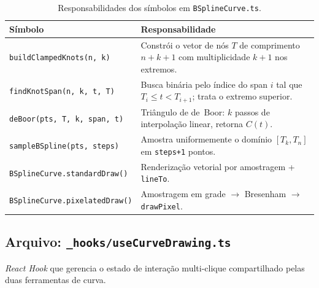 \documentclass[12pt, a4paper]{article}
\theoremstyle{remark}
\newcommand{\file}[1]{\texttt{\small #1}}
\newcommand{\code}[1]{\texttt{#1}}
\begin{document}
\begin{table}[H]
\centering
\begin{tabular}{lp{9.5cm}}
\toprule
\textbf{Símbolo} & \textbf{Responsabilidade} \\
\midrule
\code{buildClampedKnots(n, k)} & Constrói o vetor de nós $T$ de comprimento $n+k+1$
                                  com multiplicidade $k+1$ nos extremos. \\
\code{findKnotSpan(n, k, t, T)} & Busca binária pelo índice do span $i$ tal que
                                   $T_i \leq t < T_{i+1}$; trata o extremo superior. \\
\code{deBoor(pts, T, k, span, t)} & Triângulo de de~Boor: $k$ passos de interpolação
                                     linear, retorna $C(t)$. \\
\code{sampleBSpline(pts, steps)} & Amostra uniformemente o domínio $[T_k, T_n]$
                                    em \code{steps+1} pontos. \\
\code{BSplineCurve.standardDraw()} & Renderização vetorial por amostragem + \code{lineTo}. \\
\code{BSplineCurve.pixelatedDraw()} & Amostragem em grade $\to$ Bresenham $\to$ \code{drawPixel}. \\
\bottomrule
\end{tabular}
\caption{Responsabilidades dos símbolos em \file{BSplineCurve.ts}.}
\end{table}

\subsection{Arquivo: \file{\_hooks/useCurveDrawing.ts}}

\emph{React Hook} que gerencia o estado de interação multi-clique compartilhado
pelas duas ferramentas de curva.
\end{document}
